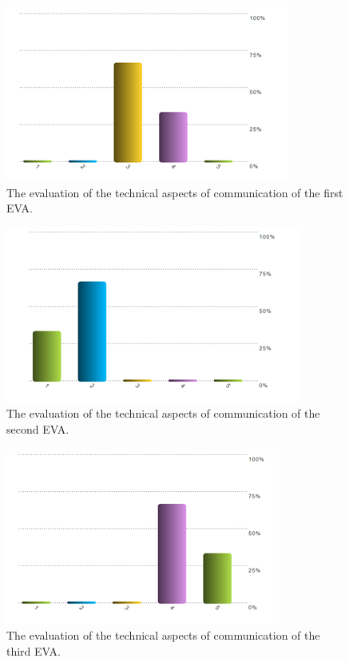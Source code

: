 \documentclass[preprint]{elsarticle}
\begin{document}
\begin{figure}
\centering
\includegraphics{img/figure18.png}
\caption{The evaluation of the technical aspects of communication of the first EVA.}
\label{fig:f18}
\end{figure}

\begin{figure}
\centering
\includegraphics{img/figure19.png}
\caption{The evaluation of the technical aspects of communication of the second EVA.}
\label{fig:f19}
\end{figure}

\begin{figure}
\centering
\includegraphics{img/figure20.png}
\caption{The evaluation of the technical aspects of communication of the third EVA.}
\label{fig:f20}
\end{figure}
\end{document}
